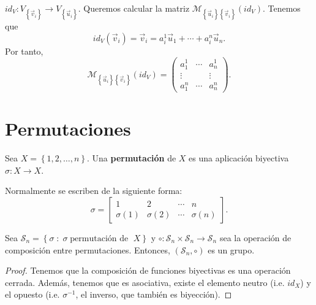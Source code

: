 \begin{eg}
	\normalfont $\displaystyle id _{V}: V_{ \left\{ \vec{v}_{i}\right\} } \to V _{ \left\{ \vec{u}_{i}\right\} } $. Queremos calcular la matriz $\displaystyle \mathcal{M}_{ \left\{ \vec{u}_{i}\right\} \left\{ \vec{v}_{i}\right\} }\left(id _{V}\right) $. Tenemos que 
	\[id _{V}\left(\vec{v}_{i}\right) = \vec{v}_{i} = a^{1}_{i}\vec{u}_{1} + \cdots +a^{n}_{i}\vec{u}_{n} .\]
Por tanto, 
\[\mathcal{M}_{ \left\{ \vec{u}_{i}\right\} \left\{ \vec{v}_{i}\right\} }\left(id _{V}\right) = \begin{pmatrix} a^{1}_{1} & \cdots & a^{1}_{n}\\
\vdots & & \vdots \\
a^{n}_{1} & \cdots & a^{n}_{n}\end{pmatrix} .\]
\end{eg}

\section{Permutaciones}
 \begin{fdefinition}[Permutación]
	 \normalfont Sea $\displaystyle X = \left\{ 1, 2, \ldots, n\right\}  $. Una \textbf{permutación} de $\displaystyle X $ es una aplicación biyectiva $\displaystyle \sigma: X \to X $. 
 \end{fdefinition}
 
 Normalmente se escriben de la siguiente forma:
 \[\sigma = \begin{bmatrix} 1 & 2 & \cdots & n\\
 \sigma\left(1\right) & \sigma\left(2\right) & \cdots & \sigma\left(n\right)\end{bmatrix}  .\]
 
 \begin{ftheorem}[]
	 \normalfont Sea $\displaystyle \mathcal{S}_{n} = \left\{ \sigma \; : \; \sigma \; \text{permutación de }\; X\right\}  $ y $\displaystyle \circ : \mathcal{S}_{n} \times \mathcal{S}_{n} \to \mathcal{S}_{n} $ sea la operación de composición entre permutaciones. Entonces, $\displaystyle \left(\mathcal{S}_{n}, \circ\right) $ es un grupo.
 \end{ftheorem}
 
 \begin{proof}
 Tenemos que la composición de funciones biyectivas es una operación cerrada. Además, tenemos que es asociativa, existe el elemento neutro (i.e. $\displaystyle id _{X} $) y el opuesto (i.e. $\displaystyle \sigma^{-1} $, el inverso, que también es biyección).
 \end{proof}

